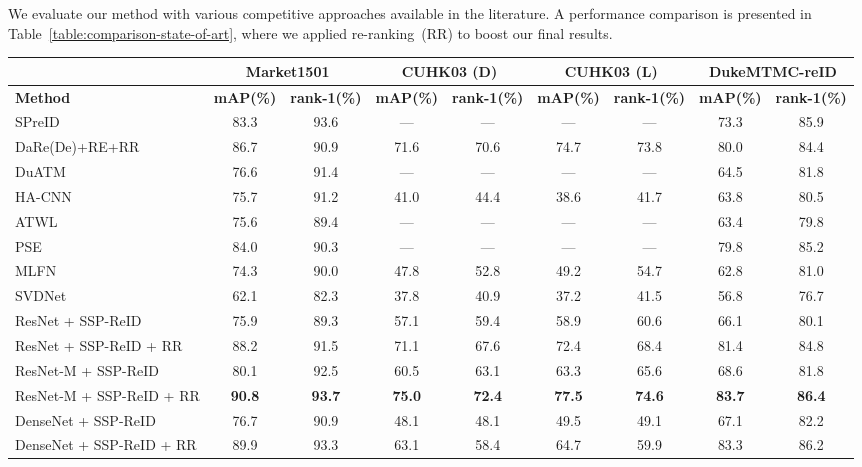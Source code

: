 \documentclass[final,3p,times,twocolumn]{elsarticle}
\begin{document}
We evaluate our method with various competitive approaches available in the literature. A performance comparison is presented in Table~\ref{table:comparison-state-of-art}, where we applied re-ranking~(RR) to boost our final results.

\begin{table*}[!htb]
\renewcommand{\arraystretch}{1.1}
\setlength{\tabcolsep}{1.1mm}
\centering
\caption{Comparison with the state-of-art, in \textbf{bold} the best results, RR stands for re-ranking}
\label{table:comparison-state-of-art}
\small
\begin{tabular}{lcccccccc}
\toprule
&\multicolumn{2}{c}{\textbf{Market1501}} &\multicolumn{2}{c}{\textbf{CUHK03 (D)}} &\multicolumn{2}{c}{\textbf{CUHK03 (L)}} & \multicolumn{2}{c}{\textbf{DukeMTMC-reID}} \\
\midrule
\textbf{Method} & \textbf{mAP(\%)} & \textbf{rank-1(\%)} & \textbf{mAP(\%)} & \textbf{rank-1(\%)} & \textbf{mAP(\%)} & \textbf{rank-1(\%)} & \textbf{mAP(\%)} & \textbf{rank-1(\%)} \\
\midrule
SPreID~\cite{kalayeh2018human}         & 83.3 & 93.6 & ---  & ---  & ---  & ---  & 73.3 & 85.9 \\
DaRe(De)+RE+RR~\cite{wang2018resource} & 86.7 & 90.9 & 71.6 & 70.6 & 74.7 & 73.8 & 80.0 & 84.4 \\
DuATM~\cite{si2018dual}                & 76.6 & 91.4 & ---  & ---  & ---  & ---  & 64.5 & 81.8 \\
HA-CNN~\cite{li2018harmonious}         & 75.7 & 91.2 & 41.0 & 44.4 & 38.6 & 41.7 & 63.8 & 80.5 \\
ATWL~\cite{ristani2018features}        & 75.6 & 89.4 & ---  & ---  & ---  & ---  & 63.4 & 79.8 \\
PSE~\cite{sarfraz2018pose}             & 84.0 & 90.3 & ---  & ---  & ---  & ---  & 79.8 & 85.2 \\
MLFN~\cite{chang2018multi}             & 74.3 & 90.0 & 47.8 & 52.8 & 49.2 & 54.7 & 62.8 & 81.0 \\
SVDNet~\cite{sun2017svdnet}            & 62.1 & 82.3 & 37.8 & 40.9 & 37.2 & 41.5 & 56.8 & 76.7 \\
\midrule
ResNet + SSP-ReID                      & 75.9 & 89.3 & 57.1 & 59.4 & 58.9 & 60.6 & 66.1 & 80.1 \\
ResNet + SSP-ReID + RR                 & 88.2 & 91.5 & 71.1 & 67.6 & 72.4 & 68.4 & 81.4 & 84.8 \\
ResNet-M + SSP-ReID                    & 80.1 & 92.5 & 60.5 & 63.1 & 63.3 & 65.6 & 68.6 & 81.8 \\
ResNet-M + SSP-ReID + RR               & \textbf{90.8} & \textbf{93.7} & \textbf{75.0} & \textbf{72.4} & \textbf{77.5} & \textbf{74.6} & \textbf{83.7} & \textbf{86.4} \\
DenseNet + SSP-ReID                    & 76.7 & 90.9 & 48.1 & 48.1 & 49.5 & 49.1 & 67.1 & 82.2 \\
DenseNet + SSP-ReID + RR               & 89.9 & 93.3 & 63.1 & 58.4 & 64.7 & 59.9 & 83.3 & 86.2 \\
\bottomrule
\end{tabular}
\end{table*}
\end{document}
